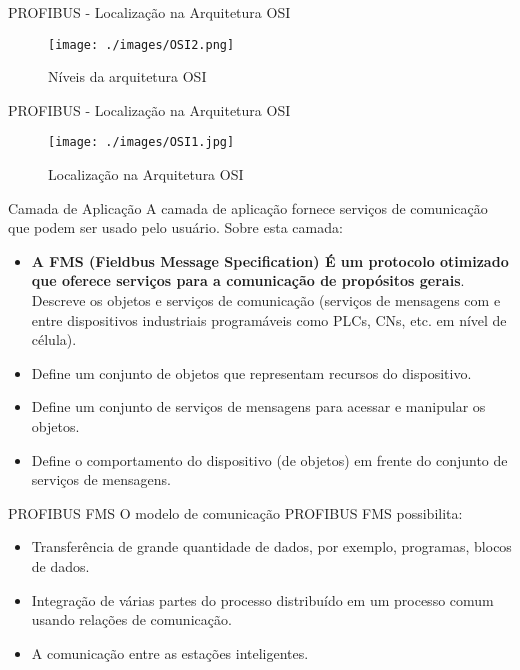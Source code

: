 \documentclass{beamer}
\begin{document}
\begin{frame}{PROFIBUS - Localização na Arquitetura OSI}
\begin{figure}
	\texttt{[image: ./images/OSI2.png]}
	\caption{Níveis da arquitetura OSI}
\end{figure}
\end{frame}

\begin{frame}{PROFIBUS - Localização na Arquitetura OSI}
\begin{figure}
	\texttt{[image: ./images/OSI1.jpg]}
	\caption{Localização na Arquitetura OSI}
\end{figure}
\end{frame}

\begin{frame}{Camada de Aplicação}
A camada de aplicação fornece serviços de comunicação que podem ser usado pelo usuário. Sobre esta camada:
\begin{itemize}
\pause \item \textbf{A FMS (Fieldbus Message Specification) É um protocolo otimizado que oferece serviços para a comunicação de propósitos gerais}. Descreve os objetos e serviços de comunicação (serviços de mensagens com e entre dispositivos industriais programáveis como PLCs, CNs, etc. em nível de célula).
\pause \item Define um conjunto de objetos que representam recursos do dispositivo. 
\pause \item Define um conjunto de serviços de mensagens para acessar e manipular os objetos.
\pause \item Define o comportamento do dispositivo (de objetos) em frente do conjunto de serviços de mensagens.
\end{itemize}
\end{frame}

\begin{frame}{PROFIBUS FMS}
O modelo de comunicação PROFIBUS FMS possibilita: 
\begin{itemize}
\pause \item Transferência de grande quantidade de dados, por exemplo, programas, blocos de dados. 
\pause \item Integração de várias partes do processo distribuído em um processo comum usando relações de comunicação. 
\pause \item A comunicação entre as estações inteligentes.
\end{itemize}
\end{frame}
\end{document}
